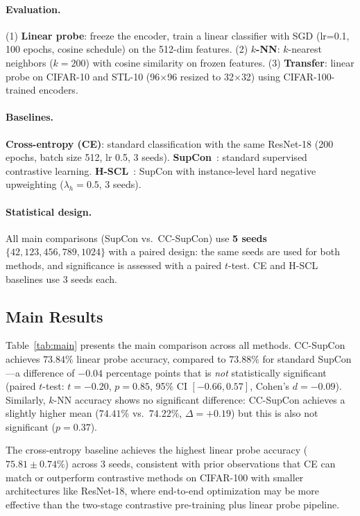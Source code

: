 \documentclass{article}
\begin{document}
\paragraph{Evaluation.} (1) \textbf{Linear probe}: freeze the encoder, train a linear classifier with SGD (lr=0.1, 100 epochs, cosine schedule) on the 512-dim features. (2) \textbf{$k$-NN}: $k$-nearest neighbors ($k = 200$) with cosine similarity on frozen features. (3) \textbf{Transfer}: linear probe on CIFAR-10 and STL-10 (96$\times$96 resized to 32$\times$32) using CIFAR-100-trained encoders.

\paragraph{Baselines.} \textbf{Cross-entropy (CE)}: standard classification with the same ResNet-18 (200 epochs, batch size 512, lr 0.5, 3 seeds). \textbf{SupCon}~\citep{khosla2020supervised}: standard supervised contrastive learning. \textbf{H-SCL}~\citep{jiang2022supervised}: SupCon with instance-level hard negative upweighting ($\lambda_h = 0.5$, 3 seeds).

\paragraph{Statistical design.} All main comparisons (SupCon vs.\ CC-SupCon) use \textbf{5 seeds} $\{42, 123, 456, 789, 1024\}$ with a paired design: the same seeds are used for both methods, and significance is assessed with a paired $t$-test. CE and H-SCL baselines use 3 seeds each.


\subsection{Main Results}
\label{sec:main_results}

Table~\ref{tab:main} presents the main comparison across all methods. CC-SupCon achieves $73.84\%$ linear probe accuracy, compared to $73.88\%$ for standard SupCon---a difference of $-0.04$ percentage points that is \emph{not} statistically significant (paired $t$-test: $t = -0.20$, $p = 0.85$, 95\% CI $[-0.66, 0.57]$, Cohen's $d = -0.09$). Similarly, $k$-NN accuracy shows no significant difference: CC-SupCon achieves a slightly higher mean ($74.41\%$ vs.\ $74.22\%$, $\Delta = +0.19$) but this is also not significant ($p = 0.37$).

The cross-entropy baseline achieves the highest linear probe accuracy ($75.81 \pm 0.74\%$) across 3 seeds, consistent with prior observations that CE can match or outperform contrastive methods on CIFAR-100 with smaller architectures like ResNet-18, where end-to-end optimization may be more effective than the two-stage contrastive pre-training plus linear probe pipeline.
\end{document}
